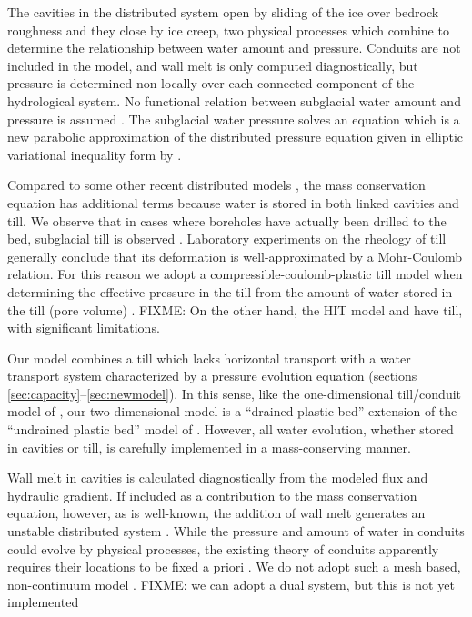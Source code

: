 \documentclass[gmd]{copernicus}   %
\begin{document}
The cavities in the distributed system open by sliding of the ice over bedrock roughness and they close by ice creep, two physical processes which combine to determine the relationship between water amount and pressure.  Conduits are not included in the model, and wall melt is only computed diagnostically, but pressure is determined non-locally over each connected component of the hydrological system.  No functional relation between subglacial water amount and pressure is assumed \citep[compare][]{FlowersClarke2002_theory}.  The subglacial water pressure solves an equation which is a new parabolic approximation of the distributed pressure equation given in elliptic variational inequality form by \cite{Schoofetal2012}.

Compared to some other recent distributed models \citep{Hewitt2013,Schoofetal2012}, the mass conservation equation has additional terms because water is stored in both linked cavities and till.  We observe that in cases where boreholes have actually been drilled to the bed, subglacial till is observed \citep{Hookeetal1997,TrufferHarrisonEchelmeyer2000,TrufferHarrison2006,Tulaczyketal2000}.  Laboratory experiments on the rheology of till \citep{Hookeetal1997,TrufferEchelmeyerHarrison2001,Tulaczyketal2000} generally conclude that its deformation is well-approximated by a Mohr-Coulomb relation.  For this reason we adopt a compressible-coulomb-plastic till model when determining the effective pressure in the till from the amount of water stored in the till (pore volume) \citep{Tulaczyketal2000}.  FIXME: On the other hand, the HIT model \citep{vanderWeletal2013} and \cite{deFleurianetal2014} have till, with significant limitations.

Our model combines a till which lacks horizontal transport with a water transport system characterized by a pressure evolution equation (sections \ref{sec:capacity}--\ref{sec:newmodel}).  In this sense, like the one-dimensional till/conduit model of \cite{vanderWeletal2013}, our two-dimensional model is a ``drained plastic bed'' extension of the ``undrained plastic bed'' model of \cite{Tulaczyketal2000b}.  However, all water evolution, whether stored in cavities or till, is carefully implemented in a mass-conserving manner.

Wall melt in cavities is calculated diagnostically from the modeled flux and hydraulic gradient.  If included as a contribution to the mass conservation equation, however, as is well-known, the addition of wall melt generates an unstable distributed system \citep{Walder1982}.  While the pressure and amount of water in conduits could evolve by physical processes, the existing theory of conduits apparently requires their locations to be fixed a priori \citep{Hewittetal2012,PimentelFlowers2011,Schoofmeltsupply,Werderetal2013}.  We do not adopt such a mesh based, non-continuum model \citep[compare][]{Hewittetal2012}.  FIXME: we can adopt a dual system, but this is not yet implemented
\end{document}
